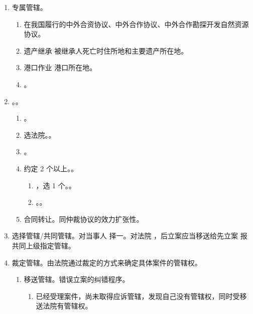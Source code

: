 \begin{enumerate}
\begin{enumerate}
        \end{enumerate}
  \item 专属管辖。
        \begin{enumerate}
          \item 在我国履行的中外合资协议、中外合作协议、中外合作勘探开发自然资源协议。
          \item 遗产继承 \yjt 被继承人死亡时住所地和主要遗产所在地。
          \item 港口作业 \yjt 港口所在地。
          \item {}。
        \end{enumerate}
  \item {}。。
        \begin{enumerate}
          \item {}。
          \item 选法院。。
          \item {} \yjt {}。
          \item 约定 2 个以上。。
                \begin{enumerate}
                  \item {}，选 1 个。。
                  \item {}。。
                \end{enumerate}
          \item 合同转让。同仲裁协议的效力扩张性。
        \end{enumerate}
  \item 选择管辖/共同管辖。对当事人 \yjt 择一。对法院 \yjt {}，后立案应当移送给先立案 \hz 报共同上级指定管辖。
  \item 裁定管辖。由法院通过裁定的方式来确定具体案件的管辖权。
        \begin{enumerate}
          \item 移送管辖。错误立案的纠错程序。
                \begin{enumerate}
                  \item 已经受理案件，尚未取得应诉管辖，发现自己没有管辖权，同时受移送法院有管辖权。

\end{enumerate}
\end{enumerate}
\end{enumerate}
